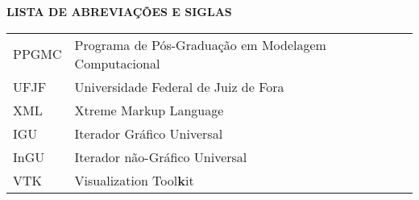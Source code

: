 \clearpage
\clearpage
\begin{center}
	\textbf{LISTA DE ABREVIAÇÕES E SIGLAS}
\end{center}

\vspace*{1.cm}

\doublespacing  \begin{tabular}{l l}
	PPGMC & Programa de Pós-Graduação em Modelagem Computacional \\
	UFJF & Universidade Federal de Juiz de Fora  \\
	XML & Xtreme Markup Language\\
	IGU & Iterador Gráfico Universal\\
	InGU & Iterador não-Gráfico Universal\\
	VTK & Visualization Tool\textbf{k}it
\end{tabular}  \thispagestyle{empty}